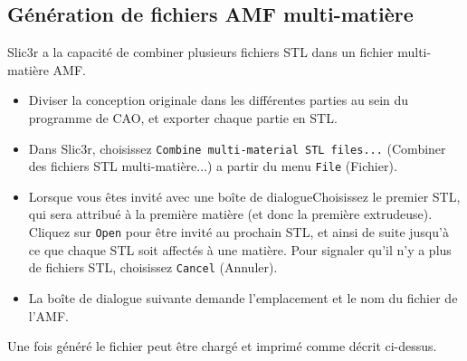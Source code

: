 \subsection{Génération de fichiers AMF multi-matière} %
\label{sub:generating_multi_material_amf_files}

Slic3r a la capacité de combiner plusieurs fichiers STL dans un fichier multi-matière AMF.


\begin{itemize}
    \item Diviser la conception originale dans les différentes parties au sein du programme de CAO, et exporter chaque partie en STL.
    \item Dans Slic3r, choisissez \texttt{Combine multi-material STL files...} (Combiner des fichiers STL multi-matière...) a partir du menu \texttt{File} (Fichier).
    \item Lorsque vous êtes invité avec une boîte de dialogueChoisissez le premier STL, qui sera attribué à la première matière (et donc la première extrudeuse). Cliquez sur \texttt{Open} pour être invité au prochain STL, et ainsi de suite jusqu'à ce que chaque STL soit affectés à une matière. Pour signaler qu'il n'y a plus de fichiers STL, choisissez \texttt{Cancel} (Annuler).
    \item La boîte de dialogue suivante demande l'emplacement et le nom du fichier de l'AMF.
\end{itemize}

Une fois généré le fichier peut être chargé et imprimé comme décrit ci-dessus.


